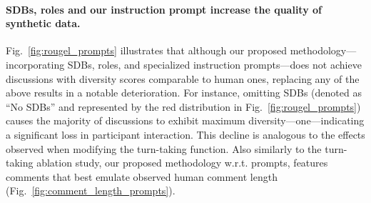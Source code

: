 \paragraph{\acp{SDB}, roles and our instruction prompt increase the quality of synthetic data.} Fig.~\ref{fig:rougel_prompts} illustrates that although our proposed methodology---incorporating \acp{SDB}, roles, and specialized instruction prompts---does not achieve discussions with diversity scores comparable to human ones, replacing any of the above results in a notable deterioration. For instance, omitting \acp{SDB} (denoted as ``No \acp{SDB}'' and represented by the red distribution in Fig.~\ref{fig:rougel_prompts}) causes the majority of discussions to exhibit maximum diversity---one---indicating a significant loss in participant interaction. This decline is analogous to the effects observed when modifying the turn-taking function. Also similarly to the turn-taking ablation study, our proposed methodology w.r.t. prompts, features comments that best emulate observed human comment length (Fig.~\ref{fig:comment_length_prompts}).